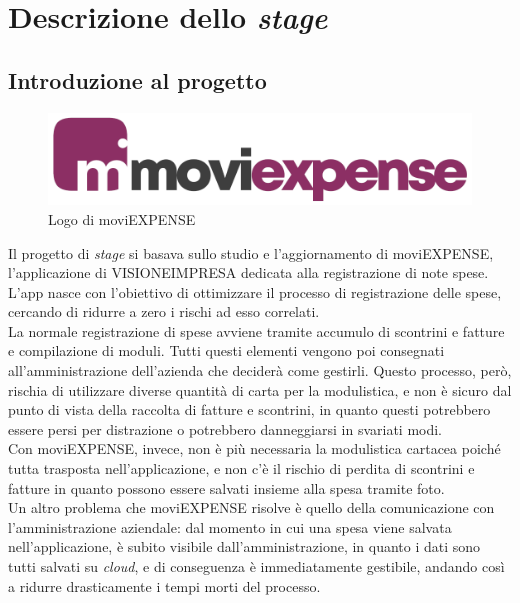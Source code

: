 \chapter{Descrizione dello \textit{stage}}
\label{cap:descrizione-stage}


\section{Introduzione al progetto}

\begin{figure}[!h]
    \centering 
    \includegraphics[width=0.5\columnwidth]{images/moviExpense_logo.png} 
    \caption{Logo di moviEXPENSE}
\end{figure}

\noindent Il progetto di \textit{stage} si basava sullo studio e l'aggiornamento di moviEXPENSE, l'applicazione di VISIONEIMPRESA dedicata alla registrazione di note spese. L'app nasce con l'obiettivo di ottimizzare il processo di registrazione delle spese, cercando di ridurre a zero i rischi ad esso correlati.\\
La normale registrazione di spese avviene tramite accumulo di scontrini e fatture e compilazione di moduli. Tutti questi elementi vengono poi consegnati all'amministrazione dell'azienda che deciderà come gestirli. Questo processo, però, rischia di utilizzare diverse quantità di carta per la modulistica, e non è sicuro dal punto di vista della raccolta di fatture e scontrini, in quanto questi potrebbero essere persi per distrazione o potrebbero danneggiarsi in svariati modi.\\
Con moviEXPENSE, invece, non è più necessaria la modulistica cartacea poiché tutta trasposta nell'applicazione, e non c'è il rischio di perdita di scontrini e fatture in quanto possono essere salvati insieme alla spesa tramite foto.\\
Un altro problema che moviEXPENSE risolve è quello della comunicazione con l'amministrazione aziendale: dal momento in cui una spesa viene salvata nell'applicazione, è subito visibile dall'amministrazione, in quanto i dati sono tutti salvati su \textit{cloud}, e di conseguenza è immediatamente gestibile, andando così a ridurre drasticamente i tempi morti del processo.

